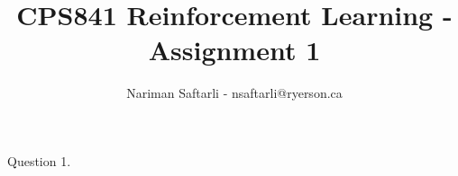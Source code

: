 \documentclass{article}
\title{CPS841 Reinforcement Learning - Assignment 1}
\author{Nariman Saftarli - nsaftarli@ryerson.ca}
\begin{document}
\maketitle
\newpage

Question 1. 
\end{document}
